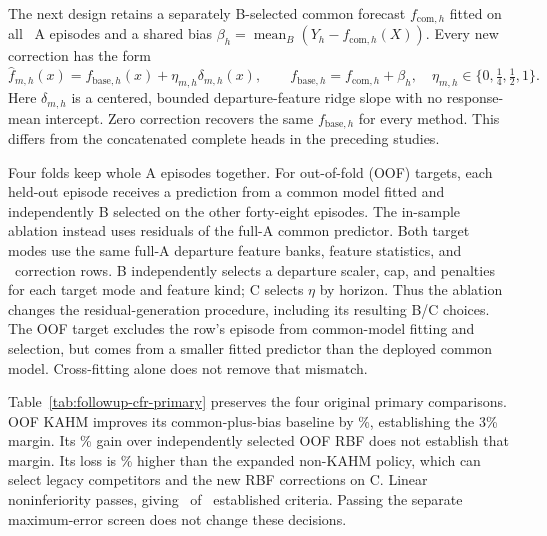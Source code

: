 The next design retains a separately B-selected common forecast
$f_{\mathrm{com},h}$ fitted on all \CFREpisodesA\ A episodes and a shared
bias $\beta_h=\operatorname{mean}_B(Y_h-f_{\mathrm{com},h}(X))$.
Every new correction has the form
\begin{equation}
 \widehat f_{m,h}(x)=f_{\mathrm{base},h}(x)+\eta_{m,h}\delta_{m,h}(x),
 \qquad f_{\mathrm{base},h}=f_{\mathrm{com},h}+\beta_h,
 \quad\eta_{m,h}\in\{0,\tfrac14,\tfrac12,1\}.
 \label{eq:followup-fixed-common}
\end{equation}
Here $\delta_{m,h}$ is a centered, bounded departure-feature ridge slope
with no response-mean intercept. Zero correction recovers the same
$f_{\mathrm{base},h}$ for every method. This differs from the concatenated
complete heads in the preceding studies.

Four folds keep whole A episodes together. For out-of-fold (OOF) targets,
each held-out episode receives a prediction from a common model fitted
and independently B selected on the other forty-eight episodes. The
in-sample ablation instead uses residuals of the full-A common predictor.
Both target modes use the same full-A departure feature banks, feature
statistics, and \CFRRowsA\ correction rows. B independently selects a
departure scaler, cap, and penalties for each target mode and feature
kind; C selects $\eta$ by horizon. Thus the ablation changes the
residual-generation procedure, including its resulting B/C choices.
The OOF target excludes the row's episode from common-model fitting and
selection, but comes from a smaller fitted predictor than the deployed
common model. Cross-fitting alone does not remove that mismatch.

Table~\ref{tab:followup-cfr-primary} preserves the four original primary
comparisons. OOF KAHM improves its common-plus-bias baseline by
\CFRGainBias\%, establishing the 3\% margin. Its \CFRGainRBF\% gain over
independently selected OOF RBF does not establish that margin. Its loss
is \CFRPolicyPenalty\% higher than the expanded non-KAHM policy, which
can select legacy competitors and the new RBF corrections on C. Linear
noninferiority passes, giving \CFRPrimaryEstablished\ of
\CFRPrimaryCount\ established criteria. Passing the separate maximum-error
screen does not change these decisions.

\begin{table}[t]
\centering\small
\caption{Residual-target study: original four primary calculations on the
computationally reproduced cohort. Definitions and margins match
Table~\ref{tab:followup-pp-primary}, with a separate four-claim family.
The reproduction adds no independent repetition units. The independent
RBF comparator selects its own scaler and cap.}
\label{tab:followup-cfr-primary}

\end{table}

